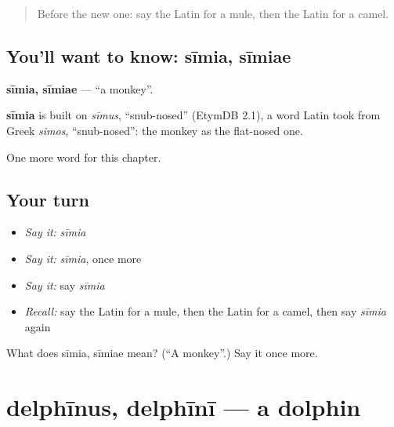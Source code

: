 \label{lesson:LA-C134-simia}



\begin{quote}
Before the new one: say the Latin for a mule, then the Latin for a camel.
\end{quote}

\subsection*{You'll want to know: sīmia, sīmiae}
\textbf{sīmia, sīmiae} — \textquotedblleft{}a monkey\textquotedblright{}.

\begin{cousinweb}
\textbf{sīmia} is built on \emph{sīmus}, \textquotedblleft{}snub-nosed\textquotedblright{} (EtymDB 2.1), a word Latin took from Greek \emph{simos}, \textquotedblleft{}snub-nosed\textquotedblright{}: the monkey as the flat-nosed one.
\end{cousinweb}

\begin{grammarlens}[title={What you've built}]
One more word for this chapter.
\end{grammarlens}

\subsection*{Your turn}
\begin{itemize}
\raggedright
  \item \emph{Say it:} \emph{sīmia}
  \item \emph{Say it:} \emph{sīmia}, once more
  \item \emph{Say it:} say \emph{sīmia}
  \item \emph{Recall:} say the Latin for a mule, then the Latin for a camel, then say \emph{sīmia} again
\end{itemize}

\begin{tcolorbox}[breakable,colback=teal!4,colframe=teal!35!black,title={Before you move on}]
What does sīmia, sīmiae mean? (\textquotedblleft{}A monkey\textquotedblright{}.) Say it once more.
\end{tcolorbox}
\section[delphīnus, delphīnī]{delphīnus, delphīnī — a dolphin}

\label{lesson:LA-C134-delphinus}



